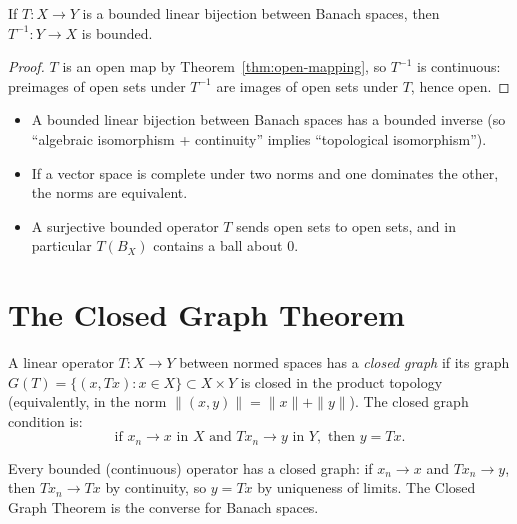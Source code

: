 \documentclass[11pt,a4paper]{article}
\begin{document}
\begin{corollary}
\label{cor:bounded-inverse}
If $T \colon X \to Y$ is a bounded linear bijection between Banach
spaces, then $T^{-1} \colon Y \to X$ is bounded.
\end{corollary}

\begin{proof}
$T$ is an open map by Theorem~\ref{thm:open-mapping}, so $T^{-1}$ is
continuous: preimages of open sets under $T^{-1}$ are images of open
sets under $T$, hence open.
\end{proof}

\begin{keyresult}[title={Open Mapping Theorem -- Key Consequences}]
\begin{itemize}[nosep]
    \item A bounded linear bijection between Banach spaces has a bounded
          inverse (so ``algebraic isomorphism + continuity'' implies
          ``topological isomorphism'').
    \item If a vector space is complete under two norms and one dominates
          the other, the norms are equivalent.
    \item A surjective bounded operator $T$ sends open sets to open
          sets, and in particular $T(B_X)$ contains a ball about $0$.
\end{itemize}
\end{keyresult}


\section{The Closed Graph Theorem}
\label{sec:closed-graph}

\begin{definition}
\label{def:closed-graph}
A linear operator $T \colon X \to Y$ between normed spaces has a
\emph{closed graph} if its graph
$G(T) = \{(x, Tx) : x \in X\} \subset X \times Y$ is closed in the
product topology (equivalently, in the norm
$\|(x,y)\| = \|x\| + \|y\|$). The closed graph condition is:
\[
    \text{if } x_n \to x \text{ in } X \text{ and } Tx_n \to y
    \text{ in } Y, \text{ then } y = Tx.
\]
\end{definition}

\begin{remark}
\label{rem:closed-graph-vs-continuity}
Every bounded (continuous) operator has a closed graph: if $x_n \to x$
and $Tx_n \to y$, then $Tx_n \to Tx$ by continuity, so $y = Tx$ by
uniqueness of limits. The Closed Graph Theorem is the converse for
Banach spaces.
\end{remark}
\end{document}
